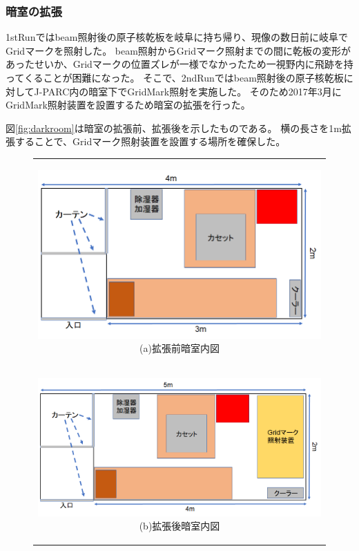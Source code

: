 \documentclass[12pt,a4paper]{jarticle}
\begin{document}
\subsubsection{暗室の拡張}
1stRunではbeam照射後の原子核乾板を岐阜に持ち帰り、現像の数日前に岐阜でGridマークを照射した。
beam照射からGridマーク照射までの間に乾板の変形があったせいか、Gridマークの位置ズレが一様でなかったため一視野内に飛跡を持ってくることが困難になった。
そこで、2ndRunではbeam照射後の原子核乾板に対してJ-PARC内の暗室下でGridMark照射を実施した。
そのため2017年3月にGridMark照射装置を設置するため暗室の拡張を行った。
\par
図\ref{fig:darkroom}は暗室の拡張前、拡張後を示したものである。
横の長さを1m拡張することで、Gridマーク照射装置を設置する場所を確保した。
\begin{figure}[htbp]
  \begin{center}
    \begin{tabular}{c}
      \begin{minipage}{1.0\hsize}
        \begin{center}
          \includegraphics[clip, width=140mm]{darkroom_before.png}
          \hspace{1.6cm} (a)拡張前暗室内図
        \end{center}
      \end{minipage}
      \\
      \begin{minipage}{1.0\hsize}
        \begin{center}
          \includegraphics[clip, width=140mm]{darkroom_after.png}
          \hspace{1.6cm} (b)拡張後暗室内図
        \end{center}
      \end{minipage}
  

\end{tabular}
\end{center}
\end{figure}
\end{document}
